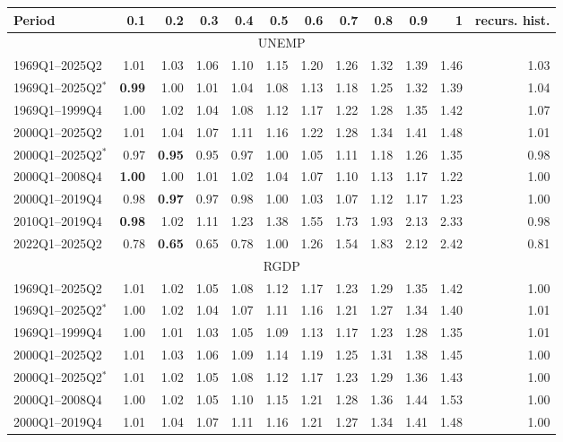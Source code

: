 \begin{tabular}{lrrrrrrrrrrr}
\hline
Period & 0.1 & 0.2 & 0.3 & 0.4 & 0.5 & 0.6 & 0.7 & 0.8 & 0.9 & 1 & recurs. hist. \\
\hline
\multicolumn{12}{c}{UNEMP} \\
1969Q1--2025Q2 & 1.01 & 1.03 & 1.06 & 1.10 & 1.15 & 1.20 & 1.26 & 1.32 & 1.39 & 1.46 & 1.03 \\
1969Q1--2025Q2$^*$ & \textbf{0.99} & 1.00 & 1.01 & 1.04 & 1.08 & 1.13 & 1.18 & 1.25 & 1.32 & 1.39 & 1.04 \\
1969Q1--1999Q4 & 1.00 & 1.02 & 1.04 & 1.08 & 1.12 & 1.17 & 1.22 & 1.28 & 1.35 & 1.42 & 1.07 \\
2000Q1--2025Q2 & 1.01 & 1.04 & 1.07 & 1.11 & 1.16 & 1.22 & 1.28 & 1.34 & 1.41 & 1.48 & 1.01 \\
2000Q1--2025Q2$^*$ & 0.97 & \textbf{0.95} & 0.95 & 0.97 & 1.00 & 1.05 & 1.11 & 1.18 & 1.26 & 1.35 & 0.98 \\
2000Q1--2008Q4 & \textbf{1.00} & 1.00 & 1.01 & 1.02 & 1.04 & 1.07 & 1.10 & 1.13 & 1.17 & 1.22 & 1.00 \\
2000Q1--2019Q4 & 0.98 & \textbf{0.97} & 0.97 & 0.98 & 1.00 & 1.03 & 1.07 & 1.12 & 1.17 & 1.23 & 1.00 \\
2010Q1--2019Q4 & \textbf{0.98} & 1.02 & 1.11 & 1.23 & 1.38 & 1.55 & 1.73 & 1.93 & 2.13 & 2.33 & 0.98 \\
2022Q1--2025Q2 & 0.78 & \textbf{0.65} & 0.65 & 0.78 & 1.00 & 1.26 & 1.54 & 1.83 & 2.12 & 2.42 & 0.81 \\
\hline
\multicolumn{12}{c}{RGDP} \\
1969Q1--2025Q2 & 1.01 & 1.02 & 1.05 & 1.08 & 1.12 & 1.17 & 1.23 & 1.29 & 1.35 & 1.42 & 1.00 \\
1969Q1--2025Q2$^*$ & 1.00 & 1.02 & 1.04 & 1.07 & 1.11 & 1.16 & 1.21 & 1.27 & 1.34 & 1.40 & 1.01 \\
1969Q1--1999Q4 & 1.00 & 1.01 & 1.03 & 1.05 & 1.09 & 1.13 & 1.17 & 1.23 & 1.28 & 1.35 & 1.01 \\
2000Q1--2025Q2 & 1.01 & 1.03 & 1.06 & 1.09 & 1.14 & 1.19 & 1.25 & 1.31 & 1.38 & 1.45 & 1.00 \\
2000Q1--2025Q2$^*$ & 1.01 & 1.02 & 1.05 & 1.08 & 1.12 & 1.17 & 1.23 & 1.29 & 1.36 & 1.43 & 1.00 \\
2000Q1--2008Q4 & 1.00 & 1.02 & 1.05 & 1.10 & 1.15 & 1.21 & 1.28 & 1.36 & 1.44 & 1.53 & 1.00 \\
2000Q1--2019Q4 & 1.01 & 1.04 & 1.07 & 1.11 & 1.16 & 1.21 & 1.27 & 1.34 & 1.41 & 1.48 & 1.00 \\

\end{tabular}
